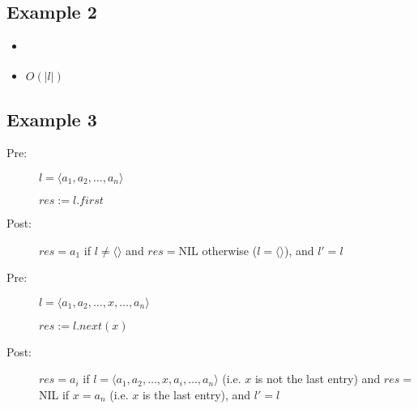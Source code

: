 \documentclass[english]{article}
\begin{document}
\subsection*{Example 2}
\begin{itemize}
\item
\begin{algorithmic}
  \ENDWHILE
\end{algorithmic}
\item $O(|l|)$
\end{itemize}

\subsection*{Example 3}
\begin{description}
\item[Pre:] $l=\langle a_1,a_2,\ldots,a_n\rangle$
\item[] $res:=l.first$
\item[Post:] $res= a_1$ if $l\neq\langle\rangle$ and $res=$NIL otherwise
($l=\langle\rangle$),
and $l'=l$
\end{description}
\vspace{5mm}
\begin{description}
\item[Pre:] $l=\langle a_1,a_2,\ldots,x,\ldots,a_n\rangle$
\item[] $res:=l.next(x)$
\item[Post:] $res = a_i$ if $l=\langle a_1,a_2,\ldots,x,a_i,\ldots,a_n\rangle$
(i.e. $x$ is not the last entry) and
$res=$NIL if $x=a_n$ (i.e. $x$ is the last entry), and
$l'=l$
\end{description}
\end{document}
